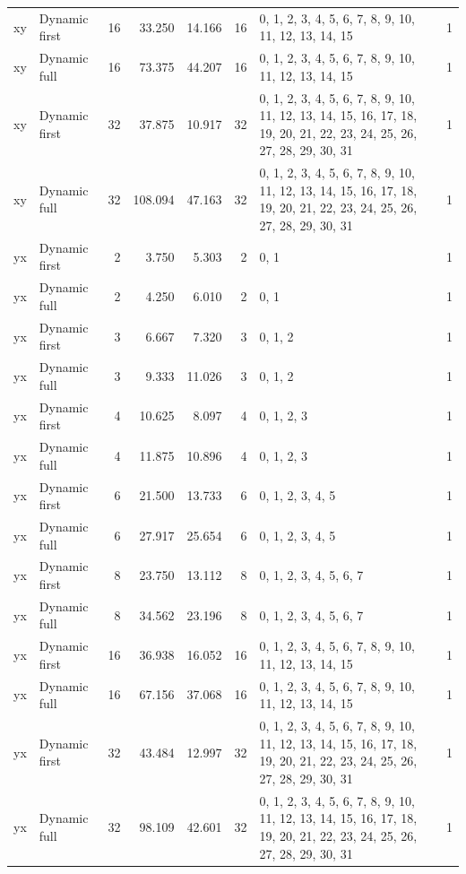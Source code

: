 \documentclass[10pt,a4paper]{article}
\begin{document}
\begin{longtable}{@{}p{23mm}p{29mm}rrrrp{36mm}r@{}}
xy & Dynamic first & 16 & 33.250 & 14.166 & 16 & 0, 1, 2, 3, 4, 5, 6, 7, 8, 9, 10, 11, 12, 13, 14, 15 & 1 \\
xy & Dynamic full & 16 & 73.375 & 44.207 & 16 & 0, 1, 2, 3, 4, 5, 6, 7, 8, 9, 10, 11, 12, 13, 14, 15 & 1 \\
xy & Dynamic first & 32 & 37.875 & 10.917 & 32 & 0, 1, 2, 3, 4, 5, 6, 7, 8, 9, 10, 11, 12, 13, 14, 15, 16, 17, 18, 19, 20, 21, 22, 23, 24, 25, 26, 27, 28, 29, 30, 31 & 1 \\
xy & Dynamic full & 32 & 108.094 & 47.163 & 32 & 0, 1, 2, 3, 4, 5, 6, 7, 8, 9, 10, 11, 12, 13, 14, 15, 16, 17, 18, 19, 20, 21, 22, 23, 24, 25, 26, 27, 28, 29, 30, 31 & 1 \\
yx & Dynamic first & 2 & 3.750 & 5.303 & 2 & 0, 1 & 1 \\
yx & Dynamic full & 2 & 4.250 & 6.010 & 2 & 0, 1 & 1 \\
yx & Dynamic first & 3 & 6.667 & 7.320 & 3 & 0, 1, 2 & 1 \\
yx & Dynamic full & 3 & 9.333 & 11.026 & 3 & 0, 1, 2 & 1 \\
yx & Dynamic first & 4 & 10.625 & 8.097 & 4 & 0, 1, 2, 3 & 1 \\
yx & Dynamic full & 4 & 11.875 & 10.896 & 4 & 0, 1, 2, 3 & 1 \\
yx & Dynamic first & 6 & 21.500 & 13.733 & 6 & 0, 1, 2, 3, 4, 5 & 1 \\
yx & Dynamic full & 6 & 27.917 & 25.654 & 6 & 0, 1, 2, 3, 4, 5 & 1 \\
yx & Dynamic first & 8 & 23.750 & 13.112 & 8 & 0, 1, 2, 3, 4, 5, 6, 7 & 1 \\
yx & Dynamic full & 8 & 34.562 & 23.196 & 8 & 0, 1, 2, 3, 4, 5, 6, 7 & 1 \\
yx & Dynamic first & 16 & 36.938 & 16.052 & 16 & 0, 1, 2, 3, 4, 5, 6, 7, 8, 9, 10, 11, 12, 13, 14, 15 & 1 \\
yx & Dynamic full & 16 & 67.156 & 37.068 & 16 & 0, 1, 2, 3, 4, 5, 6, 7, 8, 9, 10, 11, 12, 13, 14, 15 & 1 \\
yx & Dynamic first & 32 & 43.484 & 12.997 & 32 & 0, 1, 2, 3, 4, 5, 6, 7, 8, 9, 10, 11, 12, 13, 14, 15, 16, 17, 18, 19, 20, 21, 22, 23, 24, 25, 26, 27, 28, 29, 30, 31 & 1 \\
yx & Dynamic full & 32 & 98.109 & 42.601 & 32 & 0, 1, 2, 3, 4, 5, 6, 7, 8, 9, 10, 11, 12, 13, 14, 15, 16, 17, 18, 19, 20, 21, 22, 23, 24, 25, 26, 27, 28, 29, 30, 31 & 1 \\
\end{longtable}\normalsize\setlength{\tabcolsep}{6pt}
\clearpage
\end{document}

